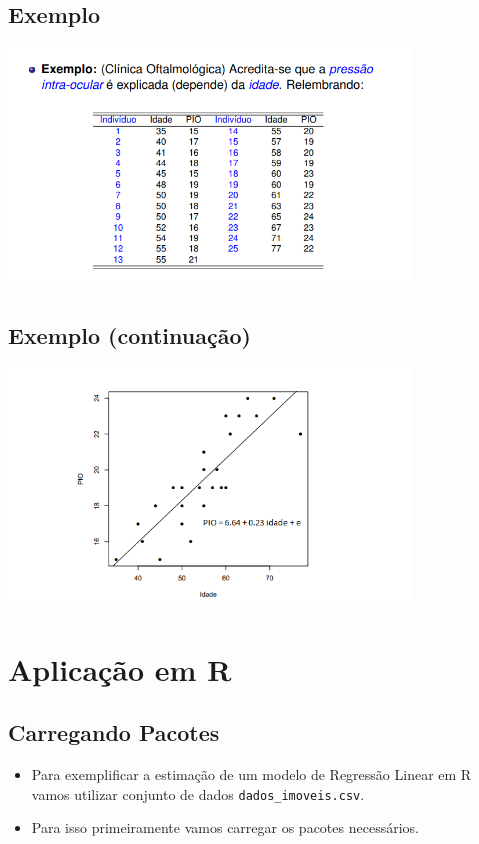 \documentclass[
  letterpaper,
  DIV=11,
  numbers=noendperiod]{scrartcl}
\begin{document}
\subsection{Exemplo}\label{exemplo}

\includegraphics[width=0.8\textwidth,height=\textheight]{dados_pio.png}

\subsection{Exemplo (continuação)}\label{exemplo-continuauxe7uxe3o}

\includegraphics[width=0.8\textwidth,height=\textheight]{graf_pio.png}

\section{Aplicação em R}\label{aplicauxe7uxe3o-em-r}

\subsection{Carregando Pacotes}\label{carregando-pacotes}

\begin{itemize}
\item
  Para exemplificar a estimação de um modelo de Regressão Linear em R
  vamos utilizar conjunto de dados \texttt{dados\_imoveis.csv}.
\item
  Para isso primeiramente vamos carregar os pacotes necessários.
\end{itemize}
\end{document}
